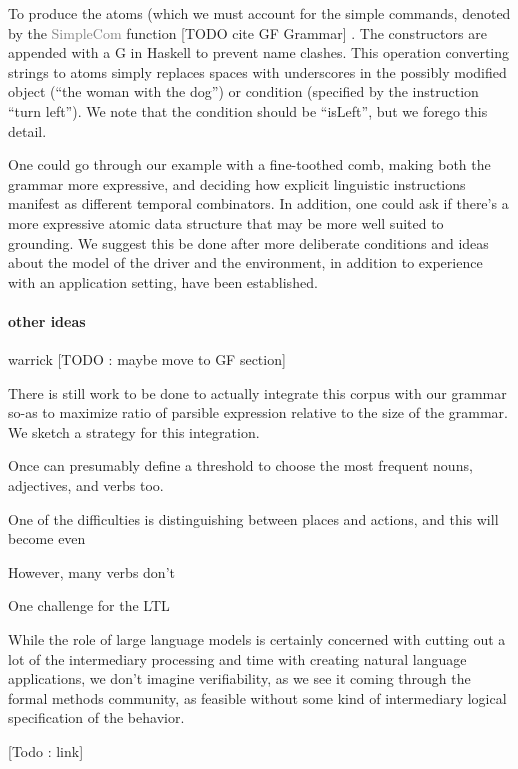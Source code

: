 \documentclass{article}
\newcommand{\gray}[1]{\textcolor{gray}{#1}}
\begin{document}
To produce the atoms (which we must account for the simple commands, denoted by
the \gray{SimpleCom} function [TODO cite GF Grammar] . The constructors are
appended with a G in Haskell to prevent name clashes. This operation converting
strings to atoms simply replaces spaces with underscores in the possibly
modified object (``the woman with the dog'') or condition (specified by the
instruction ``turn left''). We note that the condition should be ``isLeft'',
but we forego this detail.

One could go through our example with a fine-toothed comb, making both the
grammar more expressive, and deciding how explicit linguistic instructions
manifest as different temporal combinators. In addition, one could ask if there's
a more expressive atomic data structure that may be more well suited to
grounding. We suggest this be done after more deliberate conditions and ideas
about the model of the driver and the environment, in addition to experience
with an application setting, have been established.

\paragraph{other ideas}


warrick
[TODO : maybe move to GF section]


There is still work to be done to actually integrate this corpus with our
grammar so-as to maximize ratio of parsible expression relative to the size of the
grammar. We sketch a strategy for this integration.

Once can presumably define a
threshold to choose the most frequent nouns, adjectives, and verbs too.

One of the difficulties is distinguishing between places and actions, and this
will become even

However,
many verbs don't

One challenge for the LTL


While the role of large language models is certainly concerned with cutting out
a lot of the intermediary processing and time with creating natural language
applications, we don't imagine verifiability, as we see it coming through the
formal methods community, as feasible without some kind of intermediary logical
specification of the behavior.




[Todo : link]
\end{document}
